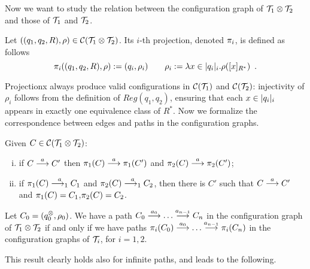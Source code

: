 %
Now we want to study the relation between the configuration graph of $\mathcal{T}_1 \otimes \mathcal{T}_2$ and those of $\mathcal{T}_1$ and $\mathcal{T}_2$. 

\begin{definition}
Let $((q_1,q_2,R),\rho) \in \mathcal{C}(\mathcal{T}_1 \otimes \mathcal{T}_2)$. Its $i$-th projection, denoted $\pi_i$, is defined as follows
\[
	\pi_i((q_1,q_2,R),\rho) := (q_i,\rho_i) \qquad \rho_i := \lambda x \in |q_i|_i.\rho([x]_{R^*}) \enspace .
\]
\end{definition}
%
%
%
Projectionx always produce valid configurations in $\mathcal{C}(\mathcal{T}_1)$ and $\mathcal{C}(\mathcal{T}_2)$: injectivity of $\rho_i$ follows from the definition of $Reg(q_1,q_2)$, ensuring that each $x \in |q_i|_i$ appears in exactly one equivalence class of $R^*$.
Now we formalize the correspondence between edges and paths in the configuration graphs.

\begin{proposition}
\label{prop:edges-correspondence}
Given $C \in \mathcal{C}(\mathcal{T}_1 \otimes \mathcal{T}_2)$:
\begin{enumerate}[(i)]
	\item if $C \overset{a}{\longrightarrow} C'$ then $\pi_1(C) \overset{a}{\longrightarrow} \pi_1(C')$ and $\pi_2(C) \overset{a}{\longrightarrow} \pi_2(C')$;
	\label{sync-to-each}
	\item if $\pi_1(C) \overset{a}{\longrightarrow_{1}} C_1$ and $\pi_2(C) \overset{a}{\longrightarrow_{1}} C_2$, then there is $C'$ such that $C\overset{a}{\longrightarrow} C'$ and $\pi_1(C) = C_1$,$\pi_2(C) = C_2$.
	\label{each-to-sync}
\end{enumerate}
\end{proposition}
%
\begin{corollary}
\label{cor:paths-correspondence}
Let $C_0 = (q_0^{\otimes},\rho_0)$. We have a path $C_0 \overset{a_0}{\longrightarrow} \dots \overset{a_{n-1}}{\longrightarrow} C_n$ in the configuration graph of $\mathcal{T}_1 \otimes \mathcal{T}_2$ if and only if we have paths $\pi_i(C_0) \overset{a_0}{\longrightarrow} \dots \overset{a_{n-1}}{\longrightarrow} \pi_i(C_n)$ in the configuration graphs of $\mathcal{T}_i$, for $i=1,2$.
\end{corollary}
%
This result clearly holds also for infinite paths, and leads to the following.

